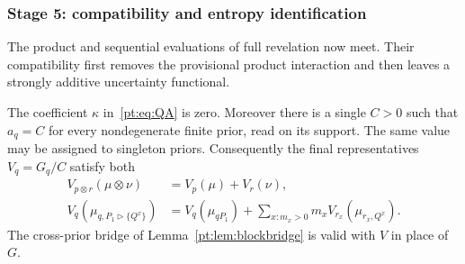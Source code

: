 \subsubsection{Stage 5: compatibility and entropy identification}

The product and sequential evaluations of full revelation now meet.  Their
compatibility first removes the provisional product interaction and then
leaves a strongly additive uncertainty functional.

\begin{lemma}
\label{pt:lem:scalecoherence}
The coefficient $\kappa$ in~\eqref{pt:eq:QA} is zero.  Moreover there is a
single $C>0$ such that $a_q=C$ for every nondegenerate finite prior, read on
its support.  The same value may be assigned to singleton priors.
Consequently the final representatives $V_q=G_q/C$ satisfy both
\begin{align}
 V_{p\otimes r}(\mu\otimes\nu)
   &=V_p(\mu)+V_r(\nu),\tag{PA}\label{pt:eq:PArecovered}\\
 V_q(\mu_{q,P_1\triangleright\{Q^x\}})
   &=V_q(\mu_{qP_1})+\sum_{x:m_x>0}m_x
     V_{r_x}(\mu_{r_x,Q^x}).\tag{CR$'$}\label{pt:eq:final-chain}
\end{align}
The cross-prior bridge of Lemma~\ref{pt:lem:blockbridge} is valid with $V$
in place of $G$.
\end{lemma}

